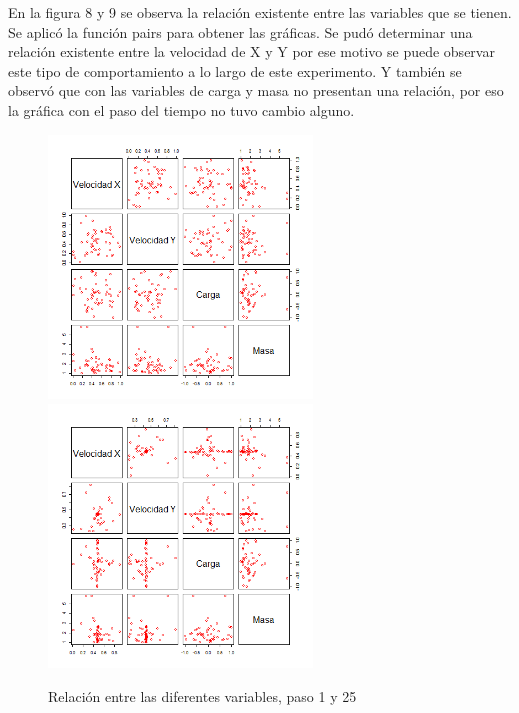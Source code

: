 \documentclass{article}
\begin{document}
En la figura 8 y 9 se observa la relación existente entre las variables que se tienen. Se aplicó la función pairs para obtener las gráficas.
Se pudó determinar una relación existente entre la velocidad de X y Y por ese motivo se puede observar este tipo de comportamiento a lo largo de este experimento. Y también se observó que con las variables de carga y masa no presentan una relación, por eso la gráfica con el paso del tiempo no tuvo cambio alguno.

\begin{figure}[H]
\centering
\includegraphics[width=7cm]{relacion_para_atraccion001.png} \includegraphics[width=7cm]{relacion_para_atraccion025.png}
\caption{Relación entre las diferentes variables, paso 1 y 25}
\end{figure}
\end{document}

